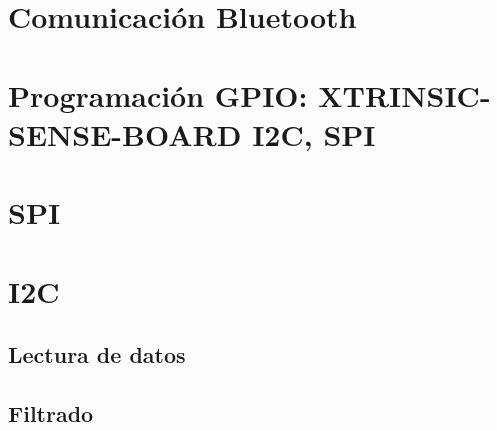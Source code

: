 \section{Comunicación Bluetooth}
\label{makereference4.5}

\section{Programación GPIO: XTRINSIC-SENSE-BOARD I2C, SPI}
\label{makereference4.6}

\section{SPI}
\label{makereference4.7}

\section{I2C}
\label{makereference4.8}

\subsection{Lectura de datos}
\label{makereference4.8.1}

\subsection{Filtrado}
\label{makereference4.8.2}